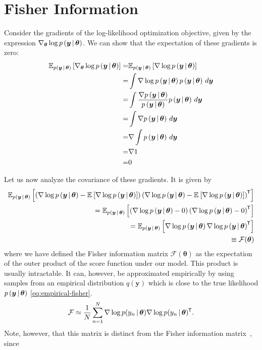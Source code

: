 \section{Fisher Information}\label{sec:fisher-information}

Consider the gradients of the log-likelihood optimization objective, given by the expression \(\nabla_{\bm\theta} \log p\left(\bm y \, | \, \bm \theta\right)\).
We can show that the expectation of these gradients is zero:
\begin{align*}
    \E{\lik}{\nabla_{\bm\theta} \log\lik} = & {} \E{\lik}{\nabla \log \lik}
    \\ =&{} \int \nabla \log \lik \lik \, d \bm y
    \\ =&{} \int \frac{\nabla \lik}{\lik} \lik \, d \bm y %
    \\ =&{} \int \nabla \lik \, d \bm y %
    \\ =&{} \nabla \int \lik \, d \bm y
    \\ =&{} \nabla 1
    \\ =&{} 0
\end{align*}

Let us now analyze the covariance of these gradients.
It is given by
%
\begin{align}\label{eq:gradient-covariance}
    \mathbb{E}_{p\left(\bm y \, | \, \bm \theta\right)}\left[\left(\nabla \log p\left(\bm y \, | \, \bm \theta\right) - \mathbb{E}_{}\left[\nabla \log p\left(\bm y \, | \, \bm \theta\right)\right]\right) \left(\nabla \log p\left(\bm y \, | \, \bm \theta\right) - \mathbb{E}_{}\left[\nabla \log p\left(\bm y \, | \, \bm \theta\right)\right]\right)^{\mkern-1.5mu\mathsf{T}}\right] \nonumber
    \\ = \mathbb{E}_{p\left(\bm y \, | \, \bm \theta\right)}\left[\left(\nabla \log p\left(\bm y \, | \, \bm \theta\right) - 0\right) \left(\nabla \log p\left(\bm y \, | \, \bm \theta\right) - 0\right)^{\mkern-1.5mu\mathsf{T}}\right] \nonumber
    \\ = \mathbb{E}_{p\left(\bm y \, | \, \bm \theta\right)}\left[\nabla \log p\left(\bm y \, | \, \bm \theta\right) \nabla \log p\left(\bm y \, | \, \bm \theta\right)^{\mkern-1.5mu\mathsf{T}}\right] \nonumber
    \\ \equiv \mathcal{F}(\bm \theta)
\end{align}
%
where we have defined the Fisher information matrix \(\mathcal{F}(\bm \theta)\) as the expectation of the outer product of the score function under our model.
This product is usually intractable.
It can, however, be approximated empirically by using samples from an empirical distribution \(q(\bm y)\) which is close to the true likelihood \(p\left(\bm y \, | \, \bm \theta\right)\) \cref{eq:empirical-fisher}.
%
\begin{equation}\label{eq:empirical-fisher}
    \mathcal{F} \approx \frac{1}{N} \sum^N_{n=1} \nabla \log p(y_n \, | \, \bm \theta) \nabla \log p(y_n \, | \, \bm \theta)^{\mkern-1.5mu\mathsf{T}}.
\end{equation}
%
Note, however, that this matrix is distinct from the Fisher information matrix~\cite{martens2020new, kunstner2019limitations}, since

